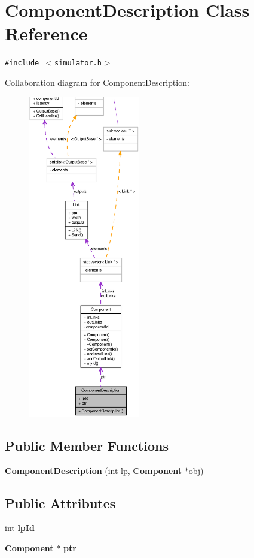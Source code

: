\section{ComponentDescription Class Reference}
\label{classComponentDescription}
{\tt \#include $<$simulator.h$>$}

Collaboration diagram for ComponentDescription:\nopagebreak
\begin{figure}[H]
\begin{center}
\leavevmode
\includegraphics[height=400pt]{classComponentDescription__coll__graph}
\end{center}
\end{figure}
\subsection*{Public Member Functions}
\begin{CompactItemize}
\item 
{\bf ComponentDescription} (int lp, {\bf Component} $\ast$obj)
\end{CompactItemize}
\subsection*{Public Attributes}
\begin{CompactItemize}
\item 
int {\bf lpId}
\item 
{\bf Component} $\ast$ {\bf ptr}
\end{CompactItemize}


